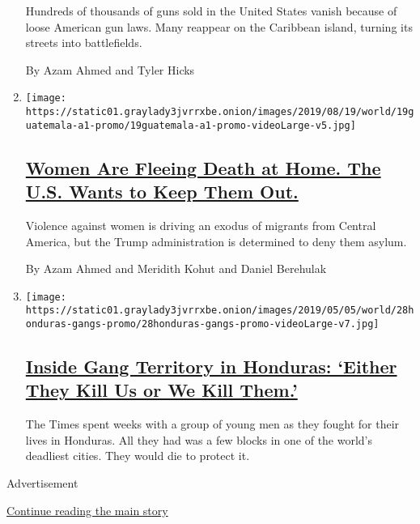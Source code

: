 \begin{enumerate}
  Hundreds of thousands of guns sold in the United States vanish because
  of loose American gun laws. Many reappear on the Caribbean island,
  turning its streets into battlefields.

  By Azam Ahmed and Tyler Hicks
\item
  \texttt{[image: https://static01.graylady3jvrrxbe.onion/images/2019/08/19/world/19guatemala-a1-promo/19guatemala-a1-promo-videoLarge-v5.jpg]}

  \hypertarget{women-are-fleeing-death-at-home-the-us-wants-to-keep-them-out}{%
  \subsection{\texorpdfstring{\href{/2019/08/18/world/americas/guatemala-violence-women-asylum.html}{Women
  Are Fleeing Death at Home. The U.S. Wants to Keep Them
  Out.}}{Women Are Fleeing Death at Home. The U.S. Wants to Keep Them Out.}}\label{women-are-fleeing-death-at-home-the-us-wants-to-keep-them-out}}

  Violence against women is driving an exodus of migrants from Central
  America, but the Trump administration is determined to deny them
  asylum.

  By Azam Ahmed and Meridith Kohut and Daniel Berehulak
\item
  \texttt{[image: https://static01.graylady3jvrrxbe.onion/images/2019/05/05/world/28honduras-gangs-promo/28honduras-gangs-promo-videoLarge-v7.jpg]}

  \hypertarget{inside-gang-territory-in-honduras-either-they-kill-us-or-we-kill-them}{%
  \subsection{\texorpdfstring{\href{/interactive/2019/05/04/world/americas/honduras-gang-violence.html}{Inside
  Gang Territory in Honduras: `Either They Kill Us or We Kill
  Them.'}}{Inside Gang Territory in Honduras: `Either They Kill Us or We Kill Them.'}}\label{inside-gang-territory-in-honduras-either-they-kill-us-or-we-kill-them}}

  The Times spent weeks with a group of young men as they fought for
  their lives in Honduras. All they had was a few blocks in one of the
  world's deadliest cities. They would die to protect it.
\end{enumerate}

Advertisement

\protect\hyperlink{after-mid3}{Continue reading the main story}

